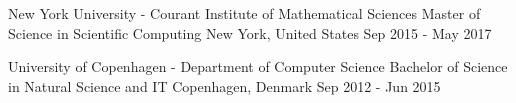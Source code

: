 

\begin{cventries}

  \cventryedu
    {New York University - Courant Institute of Mathematical Sciences} %
    {Master of Science in Scientific Computing} %
    {New York, United States} %
    {Sep 2015 - May 2017}

  \cventryedu
    {University of Copenhagen - Department of Computer Science} %
    {Bachelor of Science in Natural Science and IT} %
    {Copenhagen, Denmark} %
    {Sep 2012 - Jun 2015}

\end{cventries}
